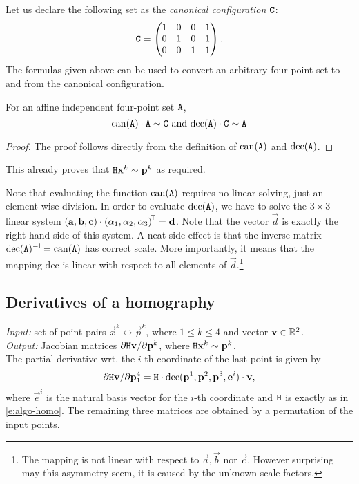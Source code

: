 Let us declare the following set as the \textit{canonical configuration} $\mathtt{C}$:
$$\mathtt{C} = \begin{pmatrix}
 1 & 0 & 0 & 1 \\
 0 & 1 & 0 & 1 \\
 0 & 0 & 1 & 1
 \end{pmatrix}.$$
The formulas given above can be used to convert an arbitrary four-point set to and from the canonical configuration.

\begin{lemma}
For an affine independent four-point set $\mathtt{A}$,
$$\mathrm{can}(\mathtt{A}) \cdot \mathtt{A} \sim \mathtt{C} \textrm{ and } \mathrm{dec}(\mathtt{A}) \cdot \mathtt{C} \sim \mathtt{A}$$
\end{lemma}
\begin{proof}
The proof follows directly from the definition of $\mathrm{can}(\mathtt{A})$ and $\mathrm{dec}(\mathtt{A})$.
\end{proof}
This already proves that $\mathtt{H} \mathbf{x}^k \sim \mathbf{p}^k$ as required.

Note that evaluating the function $\mathrm{can}(\mathtt{A})$ requires no linear solving, just an element-wise division.
In order to evaluate $\mathrm{dec}(\mathtt{A})$, we have to solve the $3 \times 3$ linear system $\left(\mathbf{a}, \mathbf{b}, \mathbf{c} \right) \cdot \left(\alpha_1, \alpha_2, \alpha_3 \right) ^{\!\mathsf{T}} = \mathbf{d}$.
Note that the vector $\vec d$ is exactly the right-hand side of this system.
A neat side-effect is that the inverse matrix $\mathrm{dec}(\mathtt{A}) ^{-\mathsf{I}} = \mathrm{can}(\mathtt{A})$ has correct scale. 
More importantly, it means that the mapping $\mathrm{dec}$ is linear with respect to all elements of $\vec d$.\footnote{
The mapping is not linear with respect to $\vec a, \vec b$ nor $\vec c$.
However surprising may this asymmetry seem, it is caused by the unknown scale factors.
}

\subsection{Derivatives of a homography}
\label{s:algo-dhomo}

\textit{Input:} set of point pairs $\vec x^k \leftrightarrow \vec p^k$, where $1 \leq k \leq 4$ and vector $\mathbf{v} \in \mathbb{R}^2$.\\
\textit{Output:} Jacobian matrices $\partial \mathtt{H} \mathbf{v} / \partial \mathbf{p}^k$, where $\mathtt{H} \mathbf{x}^k \sim \mathbf{p}^k$.\\

The partial derivative wrt. the $i$-th coordinate of the last point is given by
\begin{equation} \label{e:algo-dhomo}
\partial \mathtt{H} \mathbf{v} / \partial \mathbf{p}^4_1 = \mathtt{H} \cdot \mathrm{dec}(\mathbf{p}^1, \mathbf{p}^2, \mathbf{p}^3, \mathbf{e}^i) \cdot \mathbf{v},
\end{equation}
where $\vec e^i$ is the natural basis vector for the $i$-th coordinate and $\mathtt{H}$ is exactly as in \eqref{e:algo-homo}.
The remaining three matrices are obtained by a permutation of the input points.

